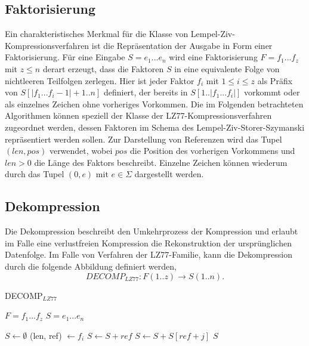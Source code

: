 \subsection{Faktorisierung}
Ein charakteristisches Merkmal für die Klasse von Lempel-Ziv-Kompressionsverfahren ist die Repräsentation der Ausgabe in Form einer Faktorisierung. Für eine Eingabe $S=e_1...e_n$ 
wird eine Faktorisierung $F=f_1...f_z$ mit $z\leq n$ derart erzeugt, dass die Faktoren $S$ in eine equivalente Folge von nichtleeren Teilfolgen zerlegen. Hier ist jeder Faktor
$f_i$ mit $1\leq i\leq z$ als Präfix von $S[|f_1...f_i-1|+1..n]$ definiert, der bereits in $S[1..|f_1...f_i|]$ vorkommt oder als einzelnes Zeichen ohne vorheriges Vorkommen. Die im 
Folgenden betrachteten Algorithmen können speziell der Klasse der LZ77-Kompressionsverfahren zugeordnet werden, dessen Faktoren im Schema des Lempel-Ziv-Storer-Szymanski repräsentiert
werden sollen. Zur Darstellung von Referenzen wird das Tupel $(len, pos)$ verwendet, wobei $pos$ die Position des vorherigen Vorkommens und $len>0$ die Länge des Faktors beschreibt. 
Einzelne Zeichen können wiederum durch das Tupel $(0, e)$ mit $e\in \Sigma$ dargestellt werden.

\subsection{Dekompression}
Die Dekompression beschreibt den Umkehrprozess der Kompression und erlaubt im Falle eine verlustfreien Kompression die Rekonstruktion der ursprünglichen Datenfolge. Im Falle von 
Verfahren der LZ77-Familie, kann die Dekompression durch die folgende Abbildung definiert werden, 
\begin{equation}
    DECOMP_{LZ77}: F(1..z) \rightarrow S(1..n).
\end{equation}

\begin{algorithm}
\centering
\caption{DECOMP$_{LZ77}$} \label{alg:decomp}
\algorithmicrequire $F=f_1...f_z$
\algorithmicensure $S=e_1...e_n$
\begin{algorithmic}
    \STATE $S \gets \emptyset$
        \STATE (len, ref) $\gets f_i$
            \STATE $S \gets S + ref$
        \ELSE
                \STATE $S \gets S + S[ref + j]$
            \ENDFOR
        \ENDIF
    \ENDFOR
    \RETURN $S$
\end{algorithmic}
\end{algorithm}

